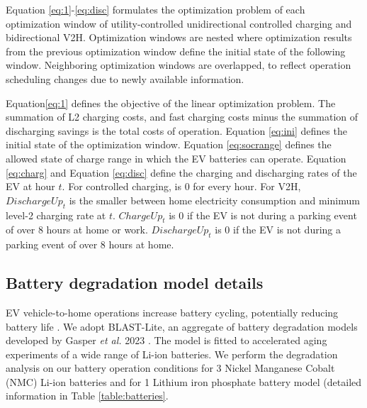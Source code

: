 \documentclass[11pt,preprint]{elsarticle}
\begin{document}


\printnomenclature

Equation \ref{eq:1}-\ref{eq:disc} formulates the optimization problem of each optimization window of utility-controlled unidirectional controlled charging and bidirectional V2H. Optimization windows are nested where optimization results from the previous optimization window define the initial state of the following window. Neighboring optimization windows are overlapped, to reflect operation scheduling changes due to newly available information. 

Equation\ref{eq:1} defines the objective of the linear optimization problem. The summation of L2 charging costs, and fast charging costs minus the summation of discharging savings is the total costs of operation. Equation \ref{eq:ini} defines the initial state of the optimization window. Equation \ref{eq:socrange} defines the allowed state of charge range in which the EV batteries can operate. Equation \ref{eq:charg} and Equation \ref{eq:disc} define the charging and discharging rates of the EV at hour $t$. For controlled charging, is 0 for every hour. For V2H, $DischargeUp_{t}$ is the smaller between home electricity consumption and minimum level-2 charging rate at $t$. $ChargeUp_{t}$ is 0 if the EV is not during a parking event of over 8 hours at home or work. $DischargeUp_{t}$ is 0 if the EV is not during a parking event of over 8 hours at home. 

\subsection{Battery degradation model details}\label{sec:SIbatdeg}

EV vehicle-to-home operations increase battery cycling, potentially reducing battery life \cite{bhoir_impact_2021,guo_impact_2019,kolawole_impact_2018}. We adopt BLAST-Lite, an aggregate of battery degradation models developed by Gasper \textit{et al.} 2023 \cite{gasper_degradation_2023}. The model is fitted to accelerated aging experiments of a wide range of Li-ion batteries. We perform the degradation analysis on our battery operation conditions for 3 Nickel Manganese Cobalt (NMC) Li-ion batteries and for 1 Lithium iron phosphate battery model (detailed information in Table \ref{table:batteries}. 
\end{document}
